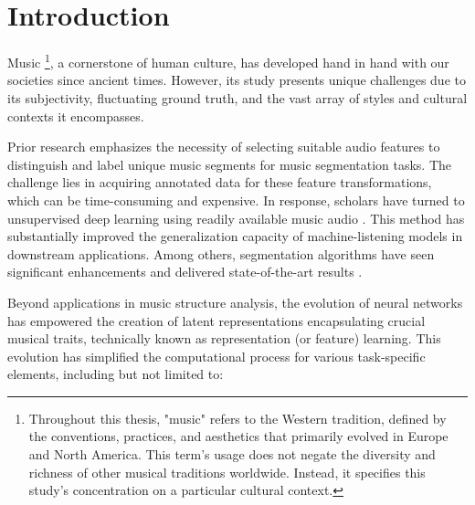 \chapter{Introduction}

Music \footnote{Throughout this thesis, "music" refers to the Western tradition, defined by the conventions, practices, and aesthetics that primarily evolved in Europe and North America. This term's usage does not negate the diversity and richness of other musical traditions worldwide. Instead, it specifies this study's concentration on a particular cultural context.}, a cornerstone of human culture, has developed hand in hand with our societies since ancient times. However, its study presents unique challenges due to its subjectivity, fluctuating ground truth, and the vast array of styles and cultural contexts it encompasses.

Prior research emphasizes the necessity of selecting suitable audio features to distinguish and label unique music segments for music segmentation tasks. The challenge lies in acquiring annotated data for these feature transformations, which can be time-consuming and expensive. In response, scholars have turned to unsupervised deep learning using readily available music audio \cite{deepfeaturesegment, Grill2015MusicAnnotations}. This method has substantially improved the generalization capacity of machine-listening models in downstream applications. Among others, segmentation algorithms have seen significant enhancements and delivered state-of-the-art results \cite{Hernandez-Olivan2021MusicFeatures, Li2023MERT:Training}.

Beyond applications in music structure analysis, the evolution of neural networks has empowered the creation of latent representations encapsulating crucial musical traits, technically known as representation (or feature) learning. This evolution has simplified the computational process for various task-specific elements, including but not limited to:

